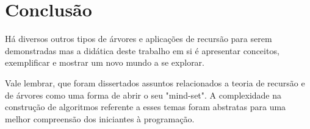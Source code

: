 \documentclass[
	12pt,				%
	oneside,   	        %
	a4paper,			%
	chapter=TITLE,		%
	section=TITLE,		%
	subsection=TITLE,	%
	subsubsection=TITLE,%
	english,			%
	french,				%
	spanish,			%
	brazil,				%
	]{pacotes/abntex2}
\begin{document}
\section{\textbf{Conclusão}}
\label{sec:conclusao}

Há diversos outros tipos de árvores e aplicações de recursão para serem demonstradas mas a didática deste trabalho em si é apresentar conceitos, exemplificar e mostrar um novo mundo a se explorar. 

Vale lembrar, que foram dissertados assuntos relacionados a teoria de recursão e de árvores como uma forma de abrir o seu "mind-set". A complexidade na construção de algoritmos referente a esses temas foram abstratas para uma melhor compreensão dos iniciantes à programação.

\newpage
\postextual
\renewcommand{\bibsection}{%
\section{\bibname}
\bibmark
\prebibhook}










\end{document}
